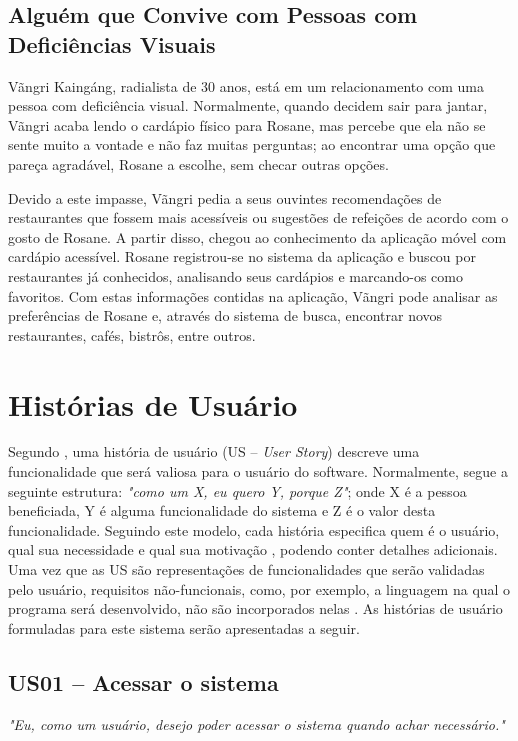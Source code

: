 \subsection{Alguém que Convive com Pessoas com Deficiências Visuais}
Vãngri Kaingáng, radialista de 30 anos, está em um relacionamento com uma pessoa com deficiência visual. Normalmente, quando decidem sair para jantar, Vãngri acaba lendo o cardápio físico para Rosane, mas percebe que ela não se sente muito a vontade e não faz muitas perguntas; ao encontrar uma opção que pareça agradável, Rosane a escolhe, sem checar outras opções.

Devido a este impasse, Vãngri pedia a seus ouvintes recomendações de restaurantes que fossem mais acessíveis ou sugestões de refeições de acordo com o gosto de Rosane. A partir disso, chegou ao conhecimento da aplicação móvel com cardápio acessível. Rosane registrou-se no sistema da aplicação e buscou por restaurantes já conhecidos, analisando seus cardápios e marcando-os como favoritos. Com estas informações contidas na aplicação, Vãngri pode analisar as preferências de Rosane e, através do sistema de busca, encontrar novos restaurantes, cafés, bistrôs, entre outros.

\section{Histórias de Usuário}

Segundo \cite{COHN2004}, uma história de usuário (US -- \emph{User Story}) descreve uma funcionalidade que será valiosa para o usuário do software. Normalmente, segue a seguinte estrutura: \textit{"como um X, eu quero Y, porque Z"}; onde X é a pessoa beneficiada, Y é alguma funcionalidade do sistema e Z é o valor desta funcionalidade. Seguindo este modelo, cada história especifica quem é o usuário, qual sua necessidade e qual sua motivação \cite{AUDY2015}, podendo conter detalhes adicionais. Uma vez que as US são representações de funcionalidades que serão validadas pelo usuário, requisitos não-funcionais, como, por exemplo, a linguagem na qual o programa será desenvolvido, não são incorporados nelas \cite{COHN2004}. As histórias de usuário formuladas para este sistema serão apresentadas a seguir.

\subsection{US01 -- Acessar o sistema}

\textit{"Eu, como um usuário, desejo poder acessar o sistema quando achar necessário."}

